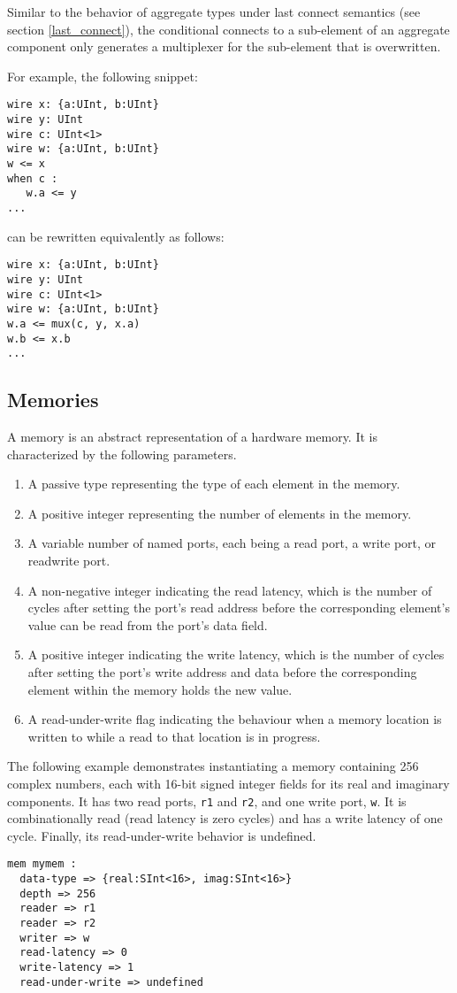 \documentclass[12pt]{article}
\begin{document}
Similar to the behavior of aggregate types under last connect semantics (see section \ref{last_connect}), the conditional connects to a sub-element of an aggregate component only generates a multiplexer for the sub-element that is overwritten.

For example, the following snippet:
\begin{lstlisting}
wire x: {a:UInt, b:UInt}
wire y: UInt
wire c: UInt<1>
wire w: {a:UInt, b:UInt}
w <= x
when c :
   w.a <= y
...
\end{lstlisting}
can be rewritten equivalently as follows:
\begin{lstlisting}
wire x: {a:UInt, b:UInt}
wire y: UInt
wire c: UInt<1>
wire w: {a:UInt, b:UInt}
w.a <= mux(c, y, x.a)
w.b <= x.b
...
\end{lstlisting}

\subsection{Memories}
A memory is an abstract representation of a hardware memory. It is characterized by the following parameters.
\begin{enumerate}
\item A passive type representing the type of each element in the memory.
\item A positive integer representing the number of elements in the memory.
\item A variable number of named ports, each being a read port, a write port, or readwrite port.
\item A non-negative integer indicating the read latency, which is the number of cycles after setting the port's read address before the corresponding element's value can be read from the port's data field.
\item A positive integer indicating the write latency, which is the number of cycles after setting the port's write address and data before the corresponding element within the memory holds the new value.
\item A read-under-write flag indicating the behaviour when a memory location is written to while a read to that location is in progress.
\end{enumerate}

The following example demonstrates instantiating a memory containing 256 complex numbers, each with 16-bit signed integer fields for its real and imaginary components. It has two read ports, \verb|r1| and \verb|r2|, and one write port, \verb|w|. It is combinationally read (read latency is zero cycles) and has a write latency of one cycle. Finally, its read-under-write behavior is undefined.
\begin{lstlisting}
mem mymem :
  data-type => {real:SInt<16>, imag:SInt<16>}
  depth => 256
  reader => r1
  reader => r2
  writer => w
  read-latency => 0
  write-latency => 1
  read-under-write => undefined
\end{lstlisting}
\end{document}
